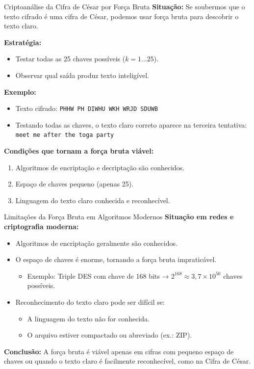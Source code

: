 \begin{frame}{Criptoanálise da Cifra de César por Força Bruta}
    \textbf{Situação:}
    Se soubermos que o texto cifrado é uma cifra de César, podemos usar força bruta para descobrir o texto claro.

    \medskip
    \textbf{Estratégia:}
    \begin{itemize}
        \item Testar todas as 25 chaves possíveis (\(k = 1 \dots 25\)).
        \item Observar qual saída produz texto inteligível.
    \end{itemize}

    \medskip
    \textbf{Exemplo:}
    \begin{itemize}
        \item Texto cifrado: \texttt{PHHW PH DIWHU WKH WRJD SDUWB}
        \item Testando todas as chaves, o texto claro correto aparece na terceira tentativa: \texttt{meet me after the toga party}
    \end{itemize}

    \medskip
    \textbf{Condições que tornam a força bruta viável:}
    \begin{enumerate}
        \item Algoritmos de encriptação e decriptação são conhecidos.
        \item Espaço de chaves pequeno (apenas 25).
        \item Linguagem do texto claro conhecida e reconhecível.
    \end{enumerate}
\end{frame}

\begin{frame}{Limitações da Força Bruta em Algoritmos Modernos}
    \textbf{Situação em redes e criptografia moderna:}
    \begin{itemize}
        \item Algoritmos de encriptação geralmente são conhecidos.
        \item O espaço de chaves é enorme, tornando a força bruta impraticável.
              \begin{itemize}
                  \item Exemplo: Triple DES com chave de 168 bits → \(2^{168} \approx 3,7 \times 10^{50}\) chaves possíveis.
              \end{itemize}
        \item Reconhecimento do texto claro pode ser difícil se:
              \begin{itemize}
                  \item A linguagem do texto não for conhecida.
                  \item O arquivo estiver compactado ou abreviado (ex.: ZIP).
              \end{itemize}
    \end{itemize}

    \textbf{Conclusão:}
    A força bruta é viável apenas em cifras com pequeno espaço de chaves ou quando o texto claro é facilmente reconhecível, como na Cifra de César.
\end{frame}


